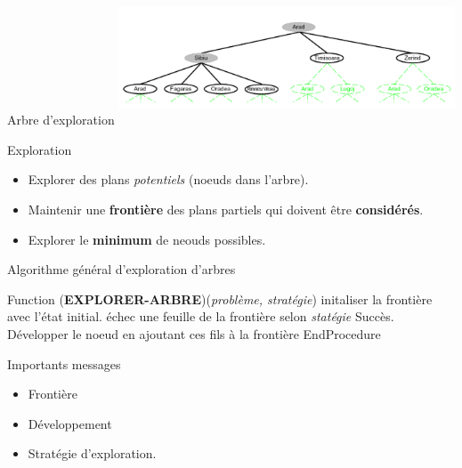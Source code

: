 \documentclass{beamer}
\begin{document}
\begin{frame}[t]{Arbre d'exploration}
 \centering
 \includegraphics[width=10cm,height=4cm]{./images/world_map_first_tree.png}

\pause

\begin{block}{Exploration}
  \begin{itemize}
    \scriptsize
  \item Explorer des plans \emph{potentiels} (noeuds dans l'arbre).
  \item Maintenir une \textbf{\alert{frontière}} des plans partiels qui doivent
    être \textbf{considérés}.
  \item Explorer le \textbf{minimum} de neouds possibles.
  \end{itemize}

\end{block}
\end{frame}

\begin{frame}[fragile]{Algorithme général d'exploration d'arbres}
  \begin{algorithm}[H]
    \begin{algorithmic}
      \scriptsize
      \STATE \alert{Function}
        (\textbf{EXPLORER-ARBRE})(\emph{problème, stratégie})
     \STATE initaliser la frontière avec l'état initial. 
      \LOOP 
        \RETURN\alert{échec} \ENDIF
      \STATE \textbf{} une feuille de la frontière selon
      \emph{statégie}
       \RETURN \alert{Succès}.\ENDIF
      \STATE \alert{Développer} le noeud en ajoutant ces \alert{fils} à la
      frontière
      \ENDLOOP
    \STATE EndProcedure
  \end{algorithmic}
   \caption{Description informelle des algorithmes d'exploration en arbre} 
 \end{algorithm} 

 \begin{block}{Importants messages}
   \begin{itemize}
     \scriptsize
     \item Frontière
     \item Développement
     \item Stratégie d'exploration.
   \end{itemize}
 \end{block}
\end{frame}
\end{document}
